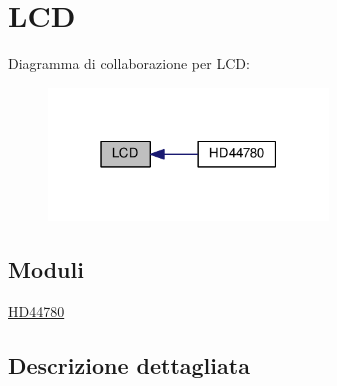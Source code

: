 \hypertarget{group___l_c_d}{\section{L\+C\+D}
\label{group___l_c_d}
}
Diagramma di collaborazione per L\+C\+D\+:\nopagebreak
\begin{figure}[H]
\begin{center}
\leavevmode
\includegraphics[width=211pt]{group___l_c_d}
\end{center}
\end{figure}
\subsection*{Moduli}
\begin{DoxyCompactItemize}
\item 
\hyperlink{group___h_d44780}{H\+D44780}
\end{DoxyCompactItemize}


\subsection{Descrizione dettagliata}
